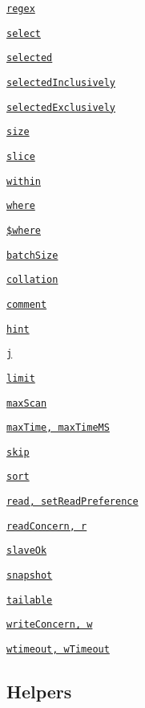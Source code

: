\begin{DoxyItemize}
\item \href{#regex}{\tt regex}
\item \href{#select}{\tt select}
\item \href{#selected}{\tt selected}
\item \href{#selectedinclusively}{\tt selected\+Inclusively}
\item \href{#selectedexclusively}{\tt selected\+Exclusively}
\item \href{#size}{\tt size}
\item \href{#slice}{\tt slice}
\item \href{#within}{\tt within}
\item \href{#where}{\tt where}
\item \href{#where-1}{\tt \$where}
\item \href{#batchsize}{\tt batch\+Size}
\item \href{#collation}{\tt collation}
\item \href{#comment}{\tt comment}
\item \href{#hint}{\tt hint}
\item \href{#j}{\tt j}
\item \href{#limit}{\tt limit}
\item \href{#maxscan}{\tt max\+Scan}
\item \href{#maxtime}{\tt max\+Time, max\+Time\+MS}
\item \href{#skip}{\tt skip}
\item \href{#sort}{\tt sort}
\item \href{#read}{\tt read, set\+Read\+Preference}
\item \href{#readconcern}{\tt read\+Concern, r}
\item \href{#slaveok}{\tt slave\+Ok}
\item \href{#snapshot}{\tt snapshot}
\item \href{#tailable}{\tt tailable}
\item \href{#writeconcern}{\tt write\+Concern, w}
\item \href{#wtimeout}{\tt wtimeout, w\+Timeout}
\end{DoxyItemize}

\subsection*{Helpers}


